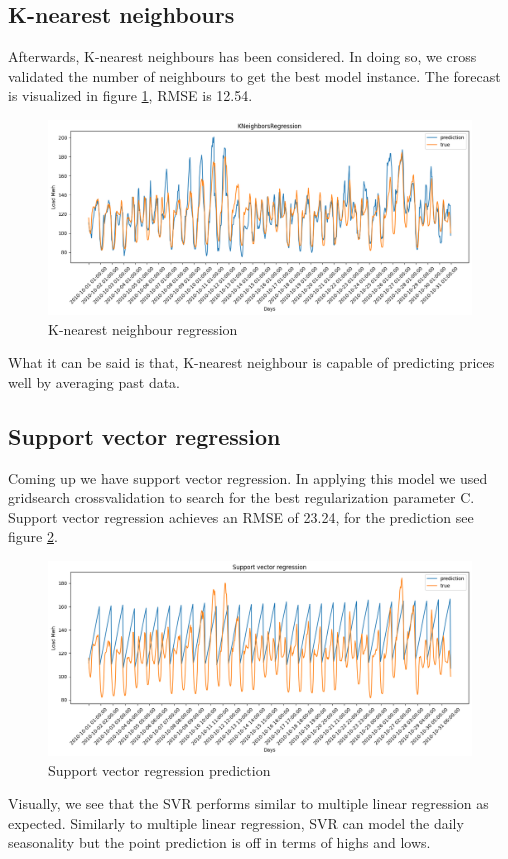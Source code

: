 \subsection{K-nearest neighbours}
Afterwards, K-nearest neighbours has been considered. In doing so, we cross validated the number of neighbours to get the best model instance. The forecast is visualized in figure \ref{fig:knn_price}, RMSE is 12.54.
\begin{figure}[!h]
    \includegraphics[width=\textwidth]{images/knn_price.png}
    \caption{K-nearest neighbour regression}
    \label{fig:knn_price}
\end{figure}
What it can be said is that, K-nearest neighbour is capable of predicting prices well by averaging past data.

\subsection{Support vector regression}
Coming up we have support vector regression. In applying this model we used gridsearch crossvalidation to search for the best regularization parameter C. Support vector regression achieves an RMSE of 23.24, for the prediction see figure \ref{fig:svr_price}.
\begin{figure}[!h]
    \includegraphics[width=\textwidth]{images/svr_price.png}
    \caption{Support vector regression prediction}
    \label{fig:svr_price}
\end{figure}
Visually, we see that the SVR performs similar to multiple linear regression as expected. Similarly to multiple linear regression, SVR can model the daily seasonality but the point prediction is off in terms of highs and lows.


